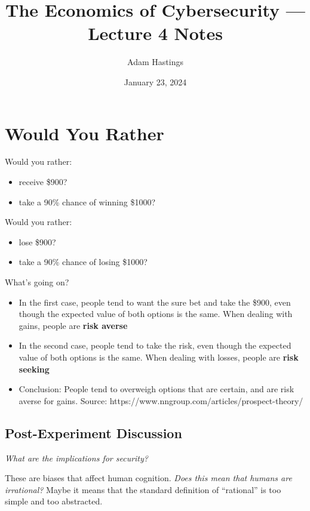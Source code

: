 \documentclass[11pt]{article}
\title{The Economics of Cybersecurity --- Lecture 4 Notes}
\date{January 23, 2024}
\author{Adam Hastings}
\begin{document}
\maketitle

\section{Would You Rather}


Would you rather:
\begin{itemize}
    \item receive \$900?
    \item take a 90\% chance of winning \$1000?
\end{itemize}

Would you rather:
\begin{itemize}
    \item lose \$900?
    \item take a 90\% chance of losing \$1000?
\end{itemize}

What's going on?
\begin{itemize}
    \item In the first case, people tend to want the sure bet and take the \$900, even though the expected value of both options is the same. When dealing with gains, people are {\bf risk averse}
    \item In the second case, people tend to take the risk, even though the expected value of both options is the same. When dealing with losses, people are {\bf risk seeking}
    \item Conclusion: People tend to overweigh options that are certain, and are risk averse for gains. Source: https://www.nngroup.com/articles/prospect-theory/
\end{itemize}


\subsection{Post-Experiment Discussion}

{\it What are the implications for security?}

These are biases that affect human cognition.
{\it Does this mean that humans are irrational?} Maybe it means that the standard definition of ``rational'' is too simple and too abstracted.
\end{document}
